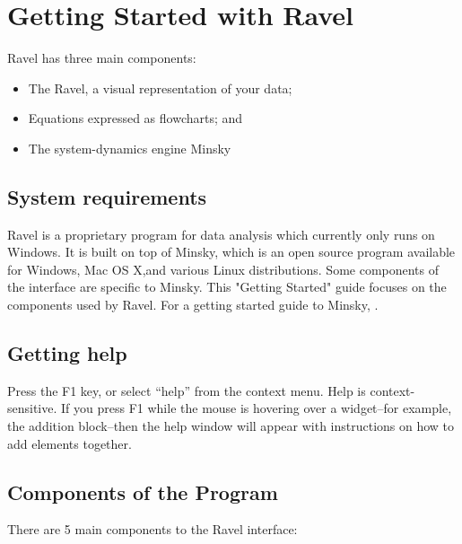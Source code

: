 \chapter{Getting Started with Ravel}

Ravel has three main components:
\begin{itemize}
\item The Ravel, a visual representation of your data;
\item Equations expressed as flowcharts; and
\item The system-dynamics engine Minsky
\end{itemize}

\section{System requirements}

Ravel is a proprietary program for data analysis which currently only runs on Windows. It is built on top of Minsky, which is an open source program available for Windows, Mac OS X,and various Linux distributions. Some components of the interface are specific to Minsky. This "Getting Started" guide focuses on the components used by Ravel. For a getting started guide to Minsky, .

\section{Getting help}

Press the F1 key, or select ``help'' from the context menu. Help is context-sensitive. If you press F1 while the mouse is hovering over a widget--for example, the addition block--then the help window will appear with instructions on how to add elements together.


\section{Components of the Program}

There are 5 main components to the Ravel interface:

